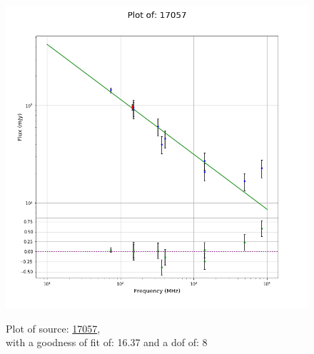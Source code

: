 \documentclass{article}
\begin{document}
\begin{figure}[H]
\begin{minipage}{0.5\textwidth}
        \includegraphics[scale = 0.35]{KmeulenTrap4P23_1min/1min17057.png}
        \captionsetup{labelformat=empty}
        \caption{Plot of source: \href{http://banana.transientskp.org/r4/vlo_KmeulenTrap4P23/runningcatalog/17057}{17057},\\with a goodness of fit of: 16.37 and a dof of: 8}
    \addtocounter{figure}{-1}
    \label{KmeulenTrap4P23:1min:17057:plot}
    \end{minipage}
\end{figure}
\end{document}
